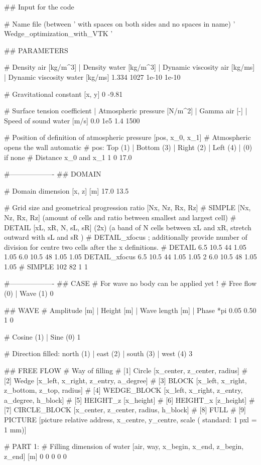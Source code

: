## Input for the code

# Name file (between ' with spaces on both sides and no spaces in name)
' Wedge_optimization_with_VTK '

## PARAMETERS

# Density air [kg/m^3] | Density water [kg/m^3] | Dynamic viscosity air [kg/ms] | Dynamic viscosity water [kg/ms]
1.334 1027 1e-10 1e-10

# Gravitational constant [x, y]
0 -9.81

# Surface tension coefficient | Atmospheric pressure [N/m^2] | Gamma air [-]	| Speed of sound water [m/s]
0.0 	1e5 	1.4		1500

# Position of definition of atmospheric pressure [pos, x_0, x_1]
# Atmospheric opens the wall automatic
# pos: Top (1)	| Bottom (3)	| Right (2)		| Left (4) | (0) if none
# Distance x_0 and x_1
1 0 17.0

#-------------------
## DOMAIN

# Domain dimension [x, z] [m]
17.0 13.5

# Grid size and geometrical progression ratio [Nx, Nz, Rx, Rz]
# SIMPLE [Nx, Nz, Rx, Rz] (amount of cells and ratio between smallest and largest cell)
# DETAIL [xL, xR, N, sL, sR] (2x) (a band of N cells between xL and xR, stretch outward with sL and sR )
# DETAIL_xfocus ; additionally provide number of division for centre two cells after the x definitions.
# DETAIL 6.5 10.5 44 1.05 1.05 6.0 10.5 48 1.05 1.05
DETAIL_xfocus 6.5 10.5 44 1.05 1.05 2 6.0 10.5 48 1.05 1.05
# SIMPLE 102 82 1 1

#-------------------
## CASE
# For wave no body can be applied yet !
# Free flow (0)	| Wave (1)
0

## WAVE
# Amplitude [m] | Height [m]	| Wave length [m]	| Phase *pi
0.05 	0.50		1		0

# Cosine (1)	| Sine (0)
1

# Direction filled: north (1)	| east (2)	|	south (3)	| west (4)
3

## FREE FLOW
# Way of filling
# [1] Circle        [x_center, z_center, radius]
# [2] Wedge         [x_left, x_right, z_entry, a_degree]
# [3] BLOCK 		[x_left, x_right, z_bottom, z_top, radius]
# [4] WEDGE_BLOCK   [x_left, x_right, z_entry, a_degree, h_block]
# [5] HEIGHT_z      [x_height]
# [6] HEIGHT_x      [z_height]
# [7] CIRCLE_BLOCK  [x_center, z_center, radius, h_block]
# [8] FULL
# [9] PICTURE		[picture relative address, x_centre, y_centre, scale ( standard: 1 pxl = 1 mm)]

# PART 1:
# Filling dimension of water [air, way, x_begin, x_end, z_begin, z_end] [m]
0 0 0 0 0

